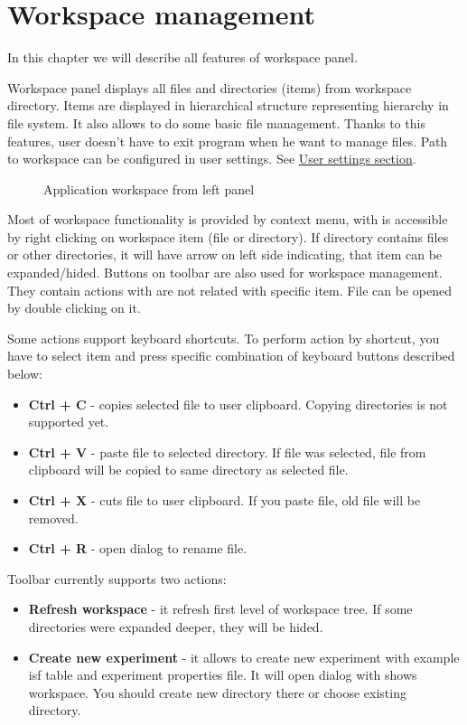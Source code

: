 \section{Workspace management}\label{section:workspace}

In this chapter we will describe all features of workspace panel.

Workspace panel displays all files and directories (items) from workspace directory. Items are displayed in hierarchical structure representing hierarchy in file system. It also allows to do some basic file management. Thanks to this features, user doesn't have to exit program when he want to manage files. Path to workspace can be configured in user settings. See \hyperref[section:user-settings]{User settings section}.

\begin{figure*}[!ht] 
	\centering
	\caption{Application workspace from left panel}
\end{figure*}

Most of workspace functionality is provided by context menu, with is accessible by right clicking on workspace item (file or directory). If directory contains files or other directories, it will have arrow on left side indicating, that item can be expanded/hided. Buttons on toolbar are also used for workspace management. They contain actions with are not related with specific item. File can be opened by double clicking on it.

Some actions support keyboard shortcuts. To perform action by shortcut, you have to select item and press specific combination of keyboard buttons described below:
\begin{itemize}
	\item \textbf{Ctrl + C} - copies selected file to user clipboard. Copying directories is not supported yet.
	\item \textbf{Ctrl + V} - paste file to selected directory. If file was selected, file from clipboard will be copied to same directory as selected file.
	\item \textbf{Ctrl + X} - cuts file to user clipboard. If you paste file, old file will be removed.
	\item \textbf{Ctrl + R} - open dialog to rename file.
\end{itemize}


Toolbar currently supports two actions:

\begin{itemize}
	\item \textbf{Refresh workspace} - it refresh first level of workspace tree. If some directories were expanded deeper, they will be hided.
	\item \textbf{Create new experiment} - it allows to create new experiment with example isf table and experiment properties file. It will open dialog with shows workspace. You should create new directory there or choose existing directory.
\end{itemize}


